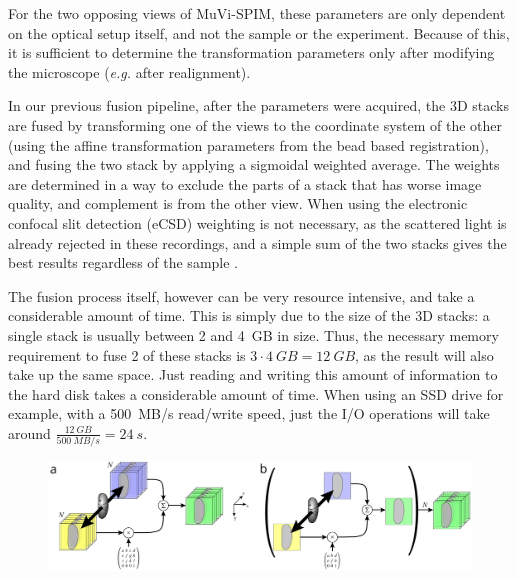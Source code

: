 For the two opposing views of MuVi-SPIM, these parameters are only dependent on the optical setup itself, and not the sample or the experiment. Because of this, it is sufficient to determine the transformation parameters only after modifying the microscope (\textit{e.g.} after realignment).

In our previous fusion pipeline, after the parameters were acquired, the 3D stacks are fused by transforming one of the views to the coordinate system of the other (using the affine transformation parameters from the bead based registration), and fusing the two stack by applying a sigmoidal weighted average. The weights are determined in a way to exclude the parts of a stack that has worse image quality, and complement is from the other view. When using the electronic confocal slit detection (eCSD) weighting is not necessary, as the scattered light is already rejected in these recordings, and a simple sum of the two stacks gives the best results regardless of the sample \cite{de_medeiros_confocal_2015}.

The fusion process itself, however can be very resource intensive, and take a considerable amount of time. This is simply due to the size of the 3D stacks: a single stack is usually between 2 and \SI{4}{GB} in size. Thus, the necessary memory requirement to fuse 2 of these stacks is $3\cdot \SI{4}{GB} = \SI{12}{GB}$, as the result will also take up the same space. Just reading and writing this amount of information to the hard disk takes a considerable amount of time. When using an SSD drive for example, with a \SI{500}{MB/s} read/write speed, just the I/O operations will take around $\frac{\SI{12}{GB}}{\SI{500}{MB/s}} = \SI{24}{s}$.


\begin{figure}
  \centering
  \includegraphics[width=1\columnwidth]{fusion/acquisition}
  \label{fig:acquisition}
\end{figure}

